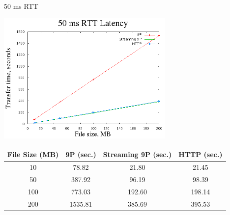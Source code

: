 \documentclass[11pt,compress]{beamer}
\begin{document}
\begin{frame}{50 ms RTT}
\begin{center}
	\includegraphics[width=0.65\textwidth]{results/50ms-stream.png}
	\scriptsize{
	\begin{table}
		\begin{center}
			\begin{tabular}{ | c | c | c | c | }
			\hline
			\bf{File Size (MB)} & \bf{9P (sec.)} & \bf{Streaming 9P (sec.)} & \bf{HTTP (sec.)} \\ \hline
			10 & 78.82 & 21.80 & 21.45 \\ \hline
			50 & 387.92 & 96.19 & 98.39 \\ \hline
			100 & 773.03 & 192.60 & 198.14 \\ \hline
			200 & 1535.81 & 385.69 & 395.53 \\ \hline
			\end{tabular}
		\end{center}
	\end{table}
	}
\end{center}
\end{frame}
\end{document}
